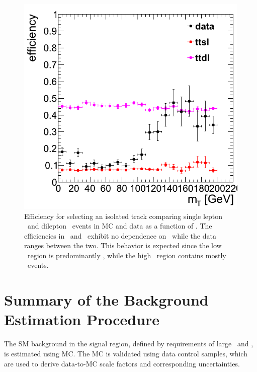\begin{figure}[hbt]
  \begin{center}
	\includegraphics[width=0.5\linewidth]{plots/vetoeff_comp.png}
	\caption{
	  \label{fig:vetoeffcomp}%
          Efficiency for selecting an isolated track comparing
          single lepton \ttlj\ and dilepton \ttll\ events in MC and 
          data as a function of \mt. The
          efficiencies in \ttlj\ and \ttll\ exhibit no dependence on
          \mt\, while the data ranges between the two. This behavior
          is expected since the low \mt\ region is predominantly \ttlj, while the
          high \mt\ region contains mostly \ttll\ events.}  
      \end{center}
\end{figure}


\section{Summary of the Background Estimation Procedure}

The SM background in the signal region, defined by requirements of
large \met\ and \mt, is estimated using MC. The MC is validated using
data control samples, which are used to derive data-to-MC scale 
factors and corresponding uncertainties.

